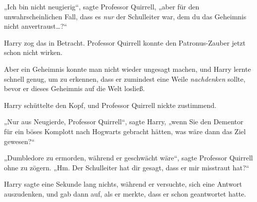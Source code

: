 „Ich bin nicht neugierig“, sagte Professor Quirrell, „aber für den unwahrscheinlichen Fall, dass es \emph{nur} der Schulleiter war, dem du das Geheimnis nicht anvertraust…?“

Harry zog das in Betracht. Professor Quirrell konnte den Patronus-Zauber jetzt schon nicht wirken.

Aber ein Geheimnis konnte man nicht wieder ungesagt machen, und Harry lernte schnell genug, um zu erkennen, dass er zumindest eine Weile \emph{nachdenken} sollte, bevor er dieses Geheimnis auf die Welt losließ.

Harry schüttelte den Kopf, und Professor Quirrell nickte zustimmend.

„Nur aus Neugierde, Professor Quirrell“, sagte Harry, „wenn Sie den Dementor für ein böses Komplott nach Hogwarts gebracht hätten, was wäre dann das Ziel gewesen?“

„Dumbledore zu ermorden, während er geschwächt wäre“, sagte Professor Quirrell ohne zu zögern. „Hm. Der Schulleiter hat dir gesagt, dass er mir misstraut hat?“

Harry sagte eine Sekunde lang nichts, während er versuchte, sich eine Antwort auszudenken, und gab dann auf, als er merkte, dass er schon geantwortet hatte.

